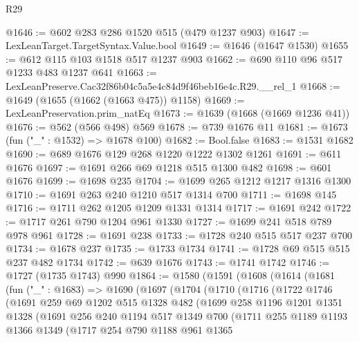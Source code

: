 \begin{lexlean}{R29}
\begin{coremodule}
@1646 := @602 @283 @286 @1520 @515 (@479 @1237 @903)
@1647 := LexLeanTarget.TargetSyntax.Value.bool
@1649 := @1646 (@1647 @1530)
@1655 := @612 @115 @103 @1518 @517 @1237 @903
@1662 := @690 @110 @96 @517 @1233 @483 @1237 @641
@1663 := LexLeanPreserve.Cac32f86b04c5a5e4c84d9f46beb16e4c.R29.__rel_1
@1668 := @1649 (@1655 (@1662 (@1663 @475)) @1158)
@1669 := LexLeanPreservation.prim_natEq
@1673 := @1639 (@1668 (@1669 @1236 @41))
@1676 := @562 (@566 @498) @569
@1678 := @739 @1676 @11
@1681 := @1673 (fun ("_" : @1532) => @1678 @100)
@1682 := Bool.false
@1683 := @1531 @1682
@1690 := @689 @1676 @129 @268 @1220 @1222 @1302 @1261
@1691 := @611 @1676
@1697 := @1691 @266 @69 @1218 @515 @1300 @482
@1698 := @601 @1676
@1699 := @1698 @235
@1704 := @1699 @265 @1212 @1217 @1316 @1300
@1710 := @1691 @263 @240 @1210 @517 @1314 @700
@1711 := @1698 @145
@1716 := @1711 @262 @1205 @1209 @1331 @1314
@1717 := @1691 @242
@1722 := @1717 @261 @790 @1204 @961 @1330
@1727 := @1699 @241 @518 @789 @978 @961
@1728 := @1691 @238
@1733 := @1728 @240 @515 @517 @237 @700
@1734 := @1678 @237
@1735 := @1733 @1734
@1741 := @1728 @69 @515 @515 @237 @482 @1734
@1742 := @639 @1676
@1743 := @1741 @1742
@1746 := @1727 (@1735 @1743) @990
@1864 := @1580
    (@1591
      (@1608
        (@1614
          (@1681
            (fun ("_" : @1683) =>
            @1690
              (@1697
                (@1704
                  (@1710
                    (@1716
                      (@1722
                        @1746
                        (@1691
                          @259
                          @69
                          @1202
                          @515
                          @1328
                          @482
                          (@1699
                            @258
                            @1196
                            @1201
                            @1351
                            @1328
                            (@1691
                              @256
                              @240
                              @1194
                              @517
                              @1349
                              @700
                              (@1711
                                @255
                                @1189
                                @1193
                                @1366
                                @1349
                                (@1717
                                  @254
                                  @790
                                  @1188
                                  @961
                                  @1365

\end{coremodule}
\end{lexlean}
